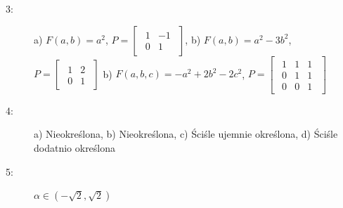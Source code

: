 \documentclass{article}
\begin{document}
\begin{description}
    \item [3:] a) $F(a, b) = a^2$, $P = \begin{bmatrix}\begin{array}{rr} 1 & -1 \\ 0 & 1 \end{array}\end{bmatrix}$,
    b) $F(a, b) = a^2 - 3b^{2}$, $P = \begin{bmatrix}\begin{array}{rr} 1 & 2 \\ 0 & 1 \end{array}\end{bmatrix}$
    b) $F(a, b, c) = -a^2 + 2b^{2} - 2c^{2}$, $P = \begin{bmatrix}\begin{array}{rrr} 1 & 1 & 1 \\ 0 & 1 & 1 \\ 0 & 0 & 1 \end{array}\end{bmatrix}$
    
    \item [4:] a) Nieokreślona, b) Nieokreślona, c) Ściśle ujemnie określona, d) Ściśle dodatnio określona
    
    \item [5:] $\alpha \in (-\sqrt{2}, \sqrt{2})$ 
\end{description}
\end{document}
